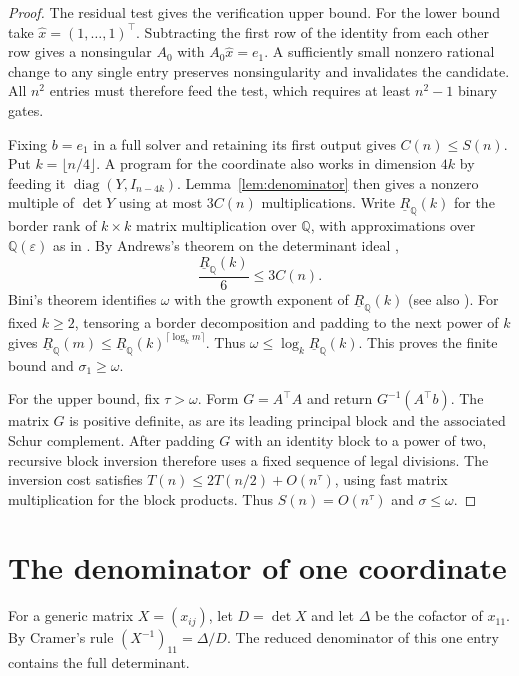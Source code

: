 \documentclass[11pt,letterpaper]{article}
\newcommand{\Q}{\mathbb{Q}}
\newcommand{\rankq}{\underline{R}_{\Q}}
\newcommand{\floor}[1]{\lfloor #1\rfloor}
\begin{document}
\begin{proof}
The residual test gives the verification upper bound. For the lower bound
take \(\hat x=(1,\ldots,1)^\top\). Subtracting the first row of the
identity from each other row gives a nonsingular \(A_0\) with \(A_0\hat x=e_1\).
A sufficiently small nonzero rational change to any single entry preserves
nonsingularity and invalidates the candidate. All \(n^2\) entries must
therefore feed the test, which requires at least \(n^2-1\) binary gates.

Fixing \(b=e_1\) in a full solver and retaining its first output gives
\(C(n)\le S(n)\). Put \(k=\floor{n/4}\). A program for the coordinate also
works in dimension \(4k\) by feeding it \(\operatorname{diag}(Y,I_{n-4k})\).
Lemma~\ref{lem:denominator} then gives a nonzero multiple of \(\det Y\)
using at most \(3C(n)\) multiplications. Write \(\rankq(k)\) for the border
rank of \(k\times k\) matrix multiplication over \(\Q\), with approximations
over \(\Q(\varepsilon)\) as in \cite[\S2.5]{andrews}. By Andrews's
theorem on the determinant ideal \cite[Theorem~3.4]{andrews},
\[
              \frac{\rankq(k)}{6}\le 3C(n).
\]
Bini's theorem identifies \(\omega\) with the growth exponent of
\(\rankq(k)\) \cite{bini} (see also \cite[Lemma~2.15]{andrews}).
For fixed \(k\ge2\), tensoring a border decomposition
and padding to the next power of \(k\) gives
\(\rankq(m)\le\rankq(k)^{\lceil\log_k m\rceil}\). Thus
\(\omega\le\log_k\rankq(k)\). This proves the finite bound and
\(\sigma_1\ge\omega\).

For the upper bound, fix \(\tau>\omega\). Form \(G=A^\top A\) and return
\(G^{-1}(A^\top b)\). The matrix \(G\) is positive definite, as are its
leading principal block and the associated Schur complement.
After padding \(G\) with an identity block to a power of two, recursive
block inversion \cite{bunch} therefore uses a fixed sequence of legal
divisions. The inversion cost satisfies \(T(n)\le2T(n/2)+O(n^\tau)\),
using fast matrix multiplication for the block products. Thus
\(S(n)=O(n^\tau)\) and \(\sigma\le\omega\).
\end{proof}

\section{The denominator of one coordinate}

For a generic matrix \(X=(x_{ij})\), let \(D=\det X\) and let \(\Delta\)
be the cofactor of \(x_{11}\). By Cramer's rule \((X^{-1})_{11}=\Delta/D\).
The reduced denominator of this one entry contains the full determinant.
\end{document}
